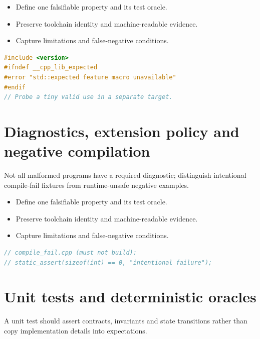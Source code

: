 \documentclass[11pt]{article}
\begin{document}
\begin{itemize}[leftmargin=*,itemsep=1pt,topsep=3pt]
\item Define one falsifiable property and its test oracle.
\item Preserve toolchain identity and machine-readable evidence.
\item Capture limitations and false-negative conditions.
\end{itemize}
\begin{lstlisting}[language=C++]
#include <version>
#ifndef __cpp_lib_expected
#error "std::expected feature macro unavailable"
#endif
// Probe a tiny valid use in a separate target.
\end{lstlisting}
\section{Diagnostics, extension policy and negative compilation}
Not all malformed programs have a required diagnostic; distinguish intentional compile-fail fixtures from runtime-unsafe negative examples.

\begin{itemize}[leftmargin=*,itemsep=1pt,topsep=3pt]
\item Define one falsifiable property and its test oracle.
\item Preserve toolchain identity and machine-readable evidence.
\item Capture limitations and false-negative conditions.
\end{itemize}
\begin{lstlisting}[language=C++]
// compile_fail.cpp (must not build):
// static_assert(sizeof(int) == 0, "intentional failure");
\end{lstlisting}
\section{Unit tests and deterministic oracles}
A unit test should assert contracts, invariants and state transitions rather than copy implementation details into expectations.
\end{document}
